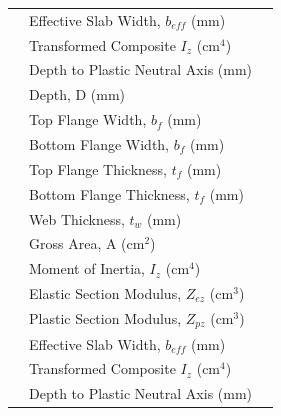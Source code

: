 \documentclass[12pt,a4paper]{report}
\numberwithin{table}{chapter}
\numberwithin{figure}{chapter}
\begin{document}
\begin{longtable}{|C{2.5cm}|L{8.0cm}|>{\centering\arraybackslash}p{5.0cm}|}
 & \textnormal{Effective Slab Width, $b_{eff}$ (mm)} &  \\[6pt]
 & \textnormal{Transformed Composite $I_z$ (cm$^4$)} &  \\[6pt]
 & \textnormal{Depth to Plastic Neutral Axis (mm)} &  \\[6pt]
\hline
{} & \textnormal{Depth, D (mm)} &  \\[6pt]
 & \textnormal{Top Flange Width, $b_f$ (mm)} &  \\[6pt]
 & \textnormal{Bottom Flange Width, $b_f$ (mm)} &  \\[6pt]
 & \textnormal{Top Flange Thickness, $t_f$ (mm)} &  \\[6pt]
 & \textnormal{Bottom Flange Thickness, $t_f$ (mm)} &  \\[6pt]
 & \textnormal{Web Thickness, $t_w$ (mm)} &  \\[6pt]
 & \textnormal{Gross Area, A (cm$^2$)} &  \\[6pt]
 & \textnormal{Moment of Inertia, $I_z$ (cm$^4$)} &  \\[6pt]
 & \textnormal{Elastic Section Modulus, $Z_{ez}$ (cm$^3$)} &  \\[6pt]
 & \textnormal{Plastic Section Modulus, $Z_{pz}$ (cm$^3$)} &  \\[6pt]
 & \textnormal{Effective Slab Width, $b_{eff}$ (mm)} &  \\[6pt]
 & \textnormal{Transformed Composite $I_z$ (cm$^4$)} &  \\[6pt]
 & \textnormal{Depth to Plastic Neutral Axis (mm)} &  \\[6pt]
\hline
\end{longtable}
\end{document}
